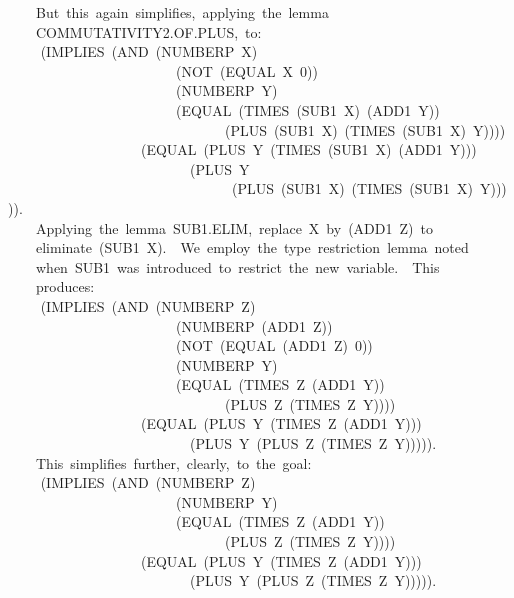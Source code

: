\documentclass[10pt]{book}
\newenvironment{pubasis}{\begin{flushleft}}{\end{flushleft}}
\begin{document}
\begin{pubasis}
~~~~But~this~again~simplifies,~applying~the~lemma\\
~~~~COMMUTATIVITY2.OF.PLUS,~to:\\

~~	~~(IMPLIES~(AND~(NUMBERP~X)\\
~~~~~~~~~~~~~~~~~~~~~~~~(NOT~(EQUAL~X~0))\\
~~~~~~~~~~~~~~~~~~~~~~~~(NUMBERP~Y)\\
~~~~~~~~~~~~~~~~~~~~~~~~(EQUAL~(TIMES~(SUB1~X)~(ADD1~Y))\\
~~~~~~~~~~~~~~~~~~~~~~~~~~~~~~~(PLUS~(SUB1~X)~(TIMES~(SUB1~X)~Y))))\\
~~~~~~~~~~~~~~~~~~~(EQUAL~(PLUS~Y~(TIMES~(SUB1~X)~(ADD1~Y)))\\
~~~~~~~~~~~~~~~~~~~~~~~~~~(PLUS~Y\\
~~~~~~~~~~~~~~~~~~~~~~~~~~~~~~~~(PLUS~(SUB1~X)~(TIMES~(SUB1~X)~Y))))).\\

~~~~Applying~the~lemma~SUB1.ELIM,~replace~X~by~(ADD1~Z)~to\\
~~~~eliminate~(SUB1~X).~~We~employ~the~type~restriction~lemma~noted\\
~~~~when~SUB1~was~introduced~to~restrict~the~new~variable.~~This\\
~~~~produces:\\

~~	~~(IMPLIES~(AND~(NUMBERP~Z)\\
~~~~~~~~~~~~~~~~~~~~~~~~(NUMBERP~(ADD1~Z))\\
~~~~~~~~~~~~~~~~~~~~~~~~(NOT~(EQUAL~(ADD1~Z)~0))\\
~~~~~~~~~~~~~~~~~~~~~~~~(NUMBERP~Y)\\
~~~~~~~~~~~~~~~~~~~~~~~~(EQUAL~(TIMES~Z~(ADD1~Y))\\
~~~~~~~~~~~~~~~~~~~~~~~~~~~~~~~(PLUS~Z~(TIMES~Z~Y))))\\
~~~~~~~~~~~~~~~~~~~(EQUAL~(PLUS~Y~(TIMES~Z~(ADD1~Y)))\\
~~~~~~~~~~~~~~~~~~~~~~~~~~(PLUS~Y~(PLUS~Z~(TIMES~Z~Y))))).\\

~~~~This~simplifies~further,~clearly,~to~the~goal:\\

~~	~~(IMPLIES~(AND~(NUMBERP~Z)\\
~~~~~~~~~~~~~~~~~~~~~~~~(NUMBERP~Y)\\
~~~~~~~~~~~~~~~~~~~~~~~~(EQUAL~(TIMES~Z~(ADD1~Y))\\
~~~~~~~~~~~~~~~~~~~~~~~~~~~~~~~(PLUS~Z~(TIMES~Z~Y))))\\
~~~~~~~~~~~~~~~~~~~(EQUAL~(PLUS~Y~(TIMES~Z~(ADD1~Y)))\\
~~~~~~~~~~~~~~~~~~~~~~~~~~(PLUS~Y~(PLUS~Z~(TIMES~Z~Y))))).\\


\end{pubasis}
\end{document}

